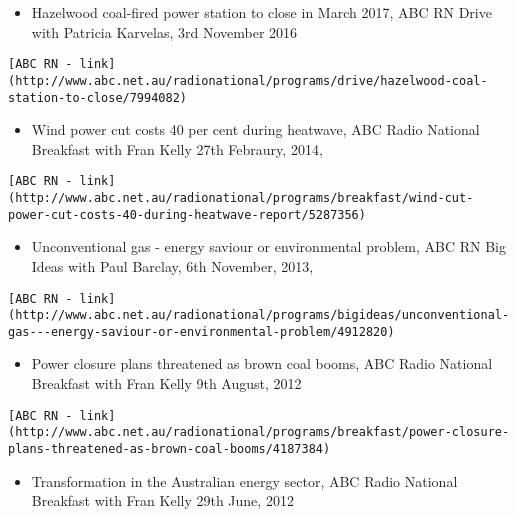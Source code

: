 \documentclass[
]{article}
\providecommand{\tightlist}{%
  \setlength{\itemsep}{0pt}\setlength{\parskip}{0pt}}
\begin{document}
\begin{itemize}
\tightlist
\item
  Hazelwood coal-fired power station to close in March 2017, ABC RN
  Drive with Patricia Karvelas, 3rd November 2016
\end{itemize}

\begin{verbatim}
[ABC RN - link](http://www.abc.net.au/radionational/programs/drive/hazelwood-coal-station-to-close/7994082)
\end{verbatim}

\begin{itemize}
\tightlist
\item
  Wind power cut costs 40 per cent during heatwave, ABC Radio National
  Breakfast with Fran Kelly 27th Febraury, 2014,
\end{itemize}

\begin{verbatim}
[ABC RN - link](http://www.abc.net.au/radionational/programs/breakfast/wind-cut-power-cut-costs-40-during-heatwave-report/5287356)
\end{verbatim}

\begin{itemize}
\tightlist
\item
  Unconventional gas - energy saviour or environmental problem, ABC RN
  Big Ideas with Paul Barclay, 6th November, 2013,
\end{itemize}

\begin{verbatim}
[ABC RN - link](http://www.abc.net.au/radionational/programs/bigideas/unconventional-gas---energy-saviour-or-environmental-problem/4912820)
\end{verbatim}

\begin{itemize}
\tightlist
\item
  Power closure plans threatened as brown coal booms, ABC Radio National
  Breakfast with Fran Kelly 9th August, 2012
\end{itemize}

\begin{verbatim}
[ABC RN - link](http://www.abc.net.au/radionational/programs/breakfast/power-closure-plans-threatened-as-brown-coal-booms/4187384)
\end{verbatim}

\begin{itemize}
\tightlist
\item
  Transformation in the Australian energy sector, ABC Radio National
  Breakfast with Fran Kelly 29th June, 2012
\end{itemize}
\end{document}
